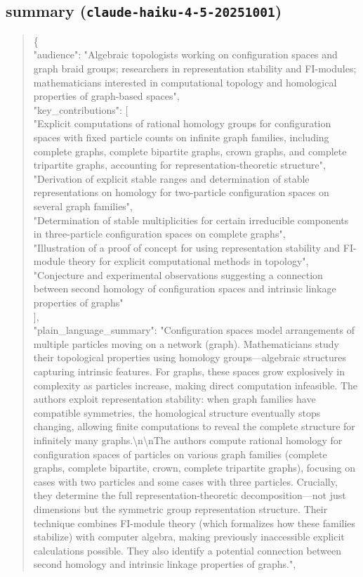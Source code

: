 \documentclass[11pt]{article}
\begin{document}
\subsection*{summary (\texttt{claude-haiku-4-5-20251001})}
\begin{quote}\small\ttfamily\raggedright
\{\\
  "audience": "Algebraic topologists working on configuration spaces and graph braid groups; researchers in representation stability and FI-modules; mathematicians interested in computational topology and homological properties of graph-based spaces",\\
  "key\_contributions": [\\
    "Explicit computations of rational homology groups for configuration spaces with fixed particle counts on infinite graph families, including complete graphs, complete bipartite graphs, crown graphs, and complete tripartite graphs, accounting for representation-theoretic structure",\\
    "Derivation of explicit stable ranges and determination of stable representations on homology for two-particle configuration spaces on several graph families",\\
    "Determination of stable multiplicities for certain irreducible components in three-particle configuration spaces on complete graphs",\\
    "Illustration of a proof of concept for using representation stability and FI-module theory for explicit computational methods in topology",\\
    "Conjecture and experimental observations suggesting a connection between second homology of configuration spaces and intrinsic linkage properties of graphs"\\
  ],\\
  "plain\_language\_summary": "Configuration spaces model arrangements of multiple particles moving on a network (graph). Mathematicians study their topological properties using homology groups---algebraic structures capturing intrinsic features. For graphs, these spaces grow explosively in complexity as particles increase, making direct computation infeasible. The authors exploit representation stability: when graph families have compatible symmetries, the homological structure eventually stops changing, allowing finite computations to reveal the complete structure for infinitely many graphs.\textbackslash{}n\textbackslash{}nThe authors compute rational homology for configuration spaces of particles on various graph families (complete graphs, complete bipartite, crown, complete tripartite graphs), focusing on cases with two particles and some cases with three particles. Crucially, they determine the full representation-theoretic decomposition---not just dimensions but the symmetric group representation structure. Their technique combines FI-module theory (which formalizes how these families stabilize) with computer algebra, making previously inaccessible explicit calculations possible. They also identify a potential connection between second homology and intrinsic linkage properties of graphs.",\\

\end{quote}
\end{document}
